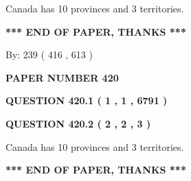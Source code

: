 \documentclass[12pt]{article}
\begin{document}
 
Canada has 10  provinces and 3 territories.
 
 
 
 
   
   
 \vspace{0.2in}
 
   
   
   
   
\vspace{1.0in} 
{\textbf{\large{ *** END OF PAPER, THANKS *** }}} 
   
   
\hspace{1.0in} By: 
 239 ( 416 ,  613 )
   
   
   
   
\newpage 
\setcounter{page}{ 
   420001 } 
   
   
   
   
 {\textbf{ \Large{ PAPER NUMBER  420  }}}
   
   
\vspace{0.2in}
   
   
   
   
   
   
 \vspace{0.2in}
 
 
 
 
   
   
  
\vspace{0.2in}
  
{\textbf{\Large{QUESTION
420.1 
 ( 1 , 1 , 6791 )
}}}
  
  
  
\vspace{0.2in}
  
{\textbf{\Large{QUESTION
420.2 
 ( 2 , 2 , 3 )
}}}
  
  
 
 
\noindent{}
 
 
Canada has 10  provinces and 3 territories.
 
 
 
 
   
   
 \vspace{0.2in}
 
   
   
   
   
\vspace{1.0in} 
{\textbf{\large{ *** END OF PAPER, THANKS *** }}} 
   
\end{document}
